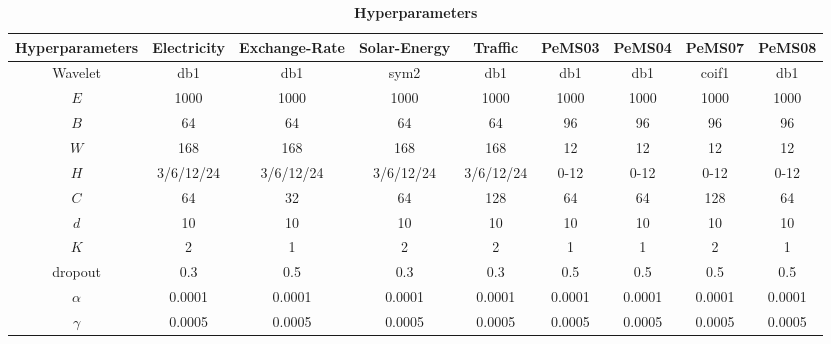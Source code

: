 \documentclass[final,12pt]{elsarticle}
\begin{document}
\begin{table}[h]  %
\label{tab-3}

  \caption{\textbf{Hyperparameters}}
  \tiny
  \centering
  \renewcommand{\arraystretch}{1.5}

  \begin{tabular}{|c|c|c|c|c|c|c|c|c|}
    \hline  Hyperparameters   & Electricity & Exchange-Rate & Solar-Energy  & Traffic 
                              & PeMS03      & PeMS04        & PeMS07        & PeMS08  \\
    \hline  Wavelet           & db1         & db1           & sym2          & db1     
                              & db1         & db1           & coif1         & db1     \\
    \hline  $E$               & 1000        & 1000          & 1000          & 1000    
                              & 1000        & 1000          & 1000          & 1000    \\
    \hline  $B$               & 64          & 64            & 64            & 64      
                              & 96          & 96            & 96            & 96      \\
    \hline  $W$               & 168         & 168           & 168           & 168     
                              & 12          & 12            & 12            & 12      \\
    \hline  $H$               & 3/6/12/24   & 3/6/12/24     & 3/6/12/24     & 3/6/12/24 
                              & 0-12        & 0-12          & 0-12          & 0-12    \\
    \hline  $C$               & 64          & 32            & 64            & 128     
                              & 64          & 64            & 128           & 64      \\
    \hline  $d$               & 10          & 10            & 10            & 10      
                              & 10          & 10            & 10            & 10      \\
    \hline  $K$               & 2           & 1             & 2             & 2       
                              & 1           & 1             & 2             & 1       \\
    \hline  dropout           & 0.3         & 0.5           & 0.3           & 0.3     
                              & 0.5         & 0.5           & 0.5           & 0.5     \\
    \hline  $\alpha$          & 0.0001      & 0.0001        & 0.0001        & 0.0001  
                              & 0.0001      & 0.0001        & 0.0001        & 0.0001  \\
    \hline  $\gamma$          & 0.0005      & 0.0005        & 0.0005        & 0.0005  
                              & 0.0005      & 0.0005        & 0.0005        & 0.0005  \\
    \hline
  \end{tabular}

\end{table}
\end{document}
